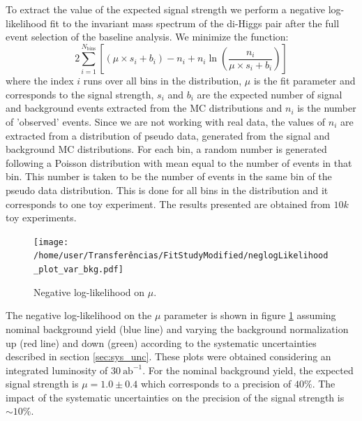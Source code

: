 To extract the value of the expected signal strength we perform a negative log-likelihood fit to the invariant mass spectrum of the di-Higgs pair after the full event selection of the baseline analysis. We minimize the function:
\begin{equation}
	2\sum_{i=1}^{N_{\text{bins}}}\left[(\mu\times s_i+b_i)-n_i+n_i\ln\left(\frac{n_i}{\mu\times s_i+b_i}\right)\right]
\end{equation}
where the index $i$ runs over all bins in the distribution, $\mu$ is the fit parameter and corresponds to the signal strength, $s_i$ and $b_i$ are the expected number of signal and background events extracted from the MC distributions and $n_i$ is the number of 'observed' events. Since we are not working with real data, the values of $n_i$ are extracted from a distribution of pseudo data, generated from the signal and background MC distributions. For each bin, a random number is generated following a Poisson distribution with mean equal to the number of events in that bin. This number is taken to be the number of events in the same bin of the pseudo data distribution. This is done for all bins in the distribution and it corresponds to one toy experiment. The results presented are obtained from $10k$ toy experiments.

\begin{figure}
	\centering
	\texttt{[image: /home/user/Transferências/FitStudyModified/neglogLikelihood\_plot\_var\_bkg.pdf]}
	\caption{\label{fig:lumi}Negative log-likelihood on $\mu$.}
\end{figure}

The negative log-likelihood on the $\mu$ parameter is shown in figure \ref{fig:lumi} assuming nominal background yield (blue line) and varying the background normalization up (red line) and down (green) according to the systematic uncertainties described in section \ref{sec:sys_unc}. These plots were obtained considering an integrated luminosity of $30~\text{ab}^{-1}$. For the nominal background yield, the expected signal strength is $\mu=1.0\pm 0.4$ which corresponds to a precision of $40\%$. The impact of the systematic uncertainties on the precision of the signal strength is $\sim 10\%$. 


